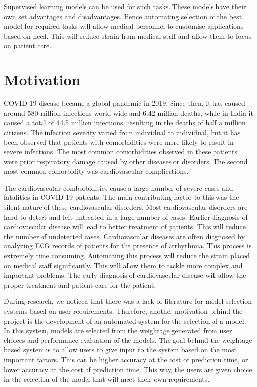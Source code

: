 Supervised learning models can be used for such tasks. These models have their own set advantages and disadvantages. Hence automating selection of the best model for required tasks will allow medical personnel to customise applications based on need. This will reduce strain from medical staff and allow them to focus on patient care.

\section{Motivation} \label{sec:motivation}

COVID-19 disease became a global pandemic in 2019. Since then, it has caused around 580 million infections world-wide and 6.42 million deaths, while in India it caused a total of 44.5 million infections, resulting in the deaths of half a million citizens. The infection severity varied from individual to individual, but it has been observed that patients with comorbidities were more likely to result in severe infections. The most common comorbidities observed in these patients were prior respiratory damage caused by other diseases or disorders. The second most common comorbidity was cardiovascular complications.

The cardiovascular comborbidities cause a large number of severe cases and fatalities in COVID-19 patients. The main contributing factor to this was the silent nature of these cardiovascular disorders. Most cardiovascular disorders are hard to detect and left untreated in a large number of cases. Earlier diagnosis of cardiovascular disease will lead to better treatment of patients. This will reduce the number of undetected cases. Cardiovascular diseases are often diagnosed by analyzing ECG records of patients for the presence of arrhythmia. This process is extremely time consuming. Automating this process will reduce the strain placed on medical staff significantly. This will allow them to tackle more complex and important problems. The early diagnosis of cardiovascular disease will allow the proper treatment and patient care for the patient.

During research, we noticed that there was a lack of literature for model selection systems based on user requirements. Therefore, another motivation behind the project is the development of an automated system for the selection of a model. In this system, models are selected from the weightage generated from user choices and performance evaluation of the models. The goal behind the weightage based system is to allow users to give input to the system based on the most important factors. This can be higher accuracy at the cost of prediction time, or lower accuracy at the cost of prediction time. This way, the users are given choice in the selection of the model that will meet their own requirements.

